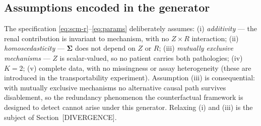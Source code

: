 \subsection{Assumptions encoded in the generator}

The specification \eqref{eq:scm-r}--\eqref{eq:params} deliberately
assumes: (i) \emph{additivity} --- the renal contribution is invariant to
mechanism, with no $Z \times R$ interaction; (ii) \emph{homoscedasticity}
--- $\bm{\Sigma}$ does not depend on $Z$ or $R$; (iii) \emph{mutually
exclusive mechanisms} --- $Z$ is scalar-valued, so no patient carries
both pathologies; (iv) $K = 2$; (v) complete data, with no missingness or
assay heterogeneity (these are introduced in the transportability
experiment). Assumption (iii) is consequential: with mutually exclusive
mechanisms no alternative causal path survives disablement, so the
redundancy phenomenon the counterfactual framework is designed to detect
cannot arise under this generator. Relaxing (i) and (iii) is the subject
of Section~[DIVERGENCE].
